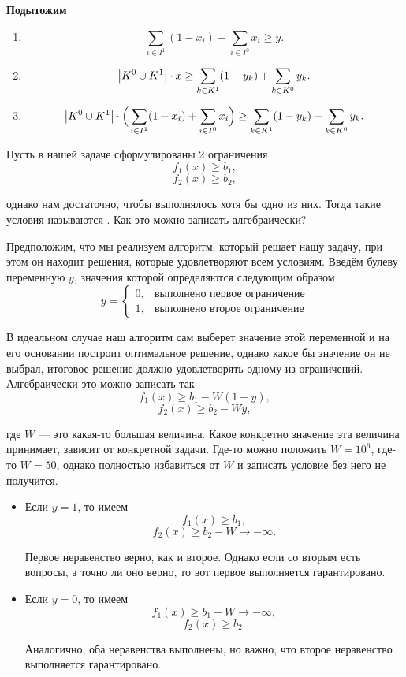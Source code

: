 \textbf{Подытожим}
\begin{enumerate}
	\item {}
	\[
	\sum_{i \in I^1}(1-x_i) + \sum_{i \in I^0}x_i \ge y.
	\]
	
	\item {}
	\[
	\abs{K^0 \cup K^1} \cdot x  \ge \sum_{k \in K^1}(1-y_k) + \sum_{k \in K^0}y_k.
	\]
	
	\item {}
	\[
	\abs{K^0 \cup K^1} \cdot \Big(\sum_{i \in I^1}(1-x_i) + \sum_{i \in I^0}x_i\Big) \ge \sum_{k \in K^1}(1-y_k) + \sum_{k \in K^0}y_k.
	\]
\end{enumerate}

\label{fact:alternative_conditions}

Пусть в нашей задаче сформулированы 2 ограничения
\[f_1(x) \ge b_1,\]
\[f_2(x) \ge b_2,\]

однако нам достаточно, чтобы выполнялось хотя бы одно из них. Тогда такие условия называются . Как это можно записать алгебраически?

Предположим, что мы реализуем алгоритм, который решает нашу задачу, при этом он находит решения, которые удовлетворяют всем условиям. Введём булеву переменную $y$, значения которой определяются следующим образом 
\[
y = \begin{cases}
	0,& \text{выполнено первое ограничение}\\
	1,&\text{выполнено второе ограничение}
\end{cases}
\]

В идеальном случае наш алгоритм сам выберет значение 
этой переменной и на его основании построит оптимальное решение, однако какое бы значение он не выбрал, итоговое решение должно удовлетворять одному из ограничений. Алгебраически это можно записать так
\[f_1(x) \ge b_1 - W(1-y),\]
\[f_2(x) \ge b_2 - Wy,\]

где $W$ --- это какая-то большая величина. Какое конкретно значение эта величина принимает, зависит от конкретной задачи. Где-то можно положить $W = 10^6$, где-то $W = 50$, однако полностью избавиться от $W$ и записать условие без него не получится.

\begin{itemize}[nosep]
	\item Если $y = 1$, то имеем
	\[f_1(x) \ge b_1,\]
	\[f_2(x) \ge b_2 - W \to -\infty.\]
	
	Первое неравенство верно, как и второе. Однако если со вторым есть вопросы, а точно ли оно верно, то вот первое выполняется гарантировано.
	
	\item Если $y = 0$, то имеем
	\[f_1(x) \ge b_1 - W \to -\infty,\]
	\[f_2(x) \ge b_2.\]
	
	Аналогично, оба неравенства выполнены, но важно, что второе неравенство выполняется гарантировано.
	
\end{itemize}

